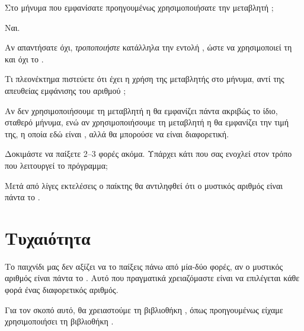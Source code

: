 \documentclass[a4paper,11pt,oneside]{book}
\begin{document}
\begin{step}
Στο μήνυμα που εμφανίσατε προηγουμένως χρησιμοποιήσατε την μεταβλητή ;

\begin{answer}
	Ναι.
\end{answer}

Αν απαντήσατε όχι, \emph{τροποποιήστε} κατάλληλα την εντολή , ώστε να χρησιμοποιεί τη  και όχι το .

Τι πλεονέκτημα πιστεύετε ότι έχει η χρήση της μεταβλητής  στο μήνυμα, αντί της απευθείας εμφάνισης του αριθμού ;

\begin{answer}
	Αν δεν χρησιμοποιήσουμε τη μεταβλητή  η  θα εμφανίζει πάντα ακριβώς το ίδιο, σταθερό μήνυμα, ενώ αν χρησιμοποιήσουμε τη μεταβλητή  η  θα εμφανίζει την τιμή της, η οποία εδώ είναι , αλλά θα μπορούσε να είναι διαφορετική.
\end{answer}

Δοκιμάστε να παίξετε 2--3 φορές ακόμα. Υπάρχει κάτι που σας ενοχλεί στον τρόπο που λειτουργεί το πρόγραμμα;

\begin{answer}
	Μετά από λίγες εκτελέσεις ο παίκτης θα αντιληφθεί ότι ο μυστικός αριθμός είναι πάντα το .
\end{answer}
\end{step}

\section{Τυχαιότητα}

Το παιχνίδι μας δεν αξίζει να το παίξεις πάνω από μία-δύο φορές, αν ο μυστικός αριθμός είναι πάντα το . Αυτό που πραγματικά χρειαζόμαστε είναι να επιλέγεται κάθε φορά ένας διαφορετικός αριθμός.


Για τον σκοπό αυτό, θα χρειαστούμε τη βιβλιοθήκη , όπως προηγουμένως είχαμε χρησιμοποιήσει τη βιβλιοθήκη . 
\end{document}
